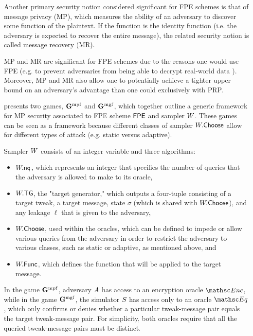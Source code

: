 
Another primary security notion considered significant for FPE schemes is that of message privacy (MP), which measures the ability of an adversary to discover some function of the plaintext.\cite{EPRINT:BRRS09} If the function is the identity function (i.e. the adversary is expected to recover the entire message), the related security notion is called message recovery (MR).

MP and MR are significant for FPE schemes due to the reasons one would use FPE (e.g. to prevent adversaries from being able to decrypt real-world data \cite{HPE:2017}). Moreover, MP and MR also allow one to potentially achieve a tighter upper bound on an adversary's advantage than one could exclusively with PRP.\

 presents two games, $\mathbf{G}^{\rm mpf}_{}$ and $\mathbf{G}^{\rm mgf}_{}$, which together outline a generic framework for MP security associated to FPE scheme $\mathsf{FPE}$ and sampler $W$. These games can be seen as a framework because different classes of sampler $W.\mathsf{Choose}$ allow for different types of attack (e.g. static versus adaptive).

Sampler $W$ consists of an integer variable and three algorithms:

\begin{itemize}
	\item $W.\mathsf{nq}$, which represents an integer that specifies the number of queries that the adversary is allowed to make to its oracle,
	\item $W.\mathsf{TG}$, the "target generator," which outputs a four-tuple consisting of a target tweak, a target message, state $\sigma$ (which is shared with $W.\mathsf{Choose}$), and any leakage $\ell$ that is given to the adversary, 
	\item $W.\mathsf{Choose}$, used within the oracles, which can be defined to impede or allow various queries from the adversary in order to restrict the adversary to various classes, such as static or adaptive, as mentioned above, and 
	\item $W.\mathsf{Func}$, which defines the function that will be applied to the target message.
\end{itemize}

In the game $\mathbf{G}^{\rm mpf}_{}$, adversary $A$ has access to an encryption oracle $\EncO$, while in the game $\mathbf{G}^{\rm mgf}_{}$, the simulator $S$ has access only to an oracle $\EqO$, which only confirms or denies whether a particular tweak-message pair equals the target tweak-message pair. For simplicity, both oracles require that all the queried tweak-message pairs must be distinct.\
 
